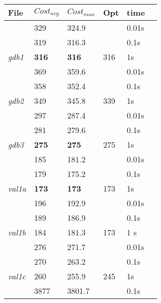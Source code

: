 \documentclass[conference,compsoc]{IEEEtran}
\begin{document}
\begin{minipage}{\linewidth}
	\centering	
	 \label{tab:title} 	
	\begin{tabular}{ C{0.6in} C{0.4in} *4{C{0.4in}}}\toprule[0.4pt]
		\bf File          & \bf $Cost_{avg}$  & \bf $Cost_{max}$ & \bf Opt & \bf time \\\midrule
						  & 329               & 324.9            &         & 0.01s    \\
				          & 319               & 316.3            &         & 0.1s     \\
		\textit{gdb1}     & \bf 316           & \bf 316          & 316     & 1s       \\
		\bottomrule[0.25pt]
						  & 369               & 359.6            &         & 0.01s    \\
						  & 358               & 352.4            &         & 0.1s     \\
		\textit{gdb2}	  & 349               & 345.8            & 339     & 1s       \\
		\bottomrule[0.25pt]
						  & 297               & 287.4            &         & 0.01s    \\
						  & 281 		      & 279.6            &         & 0.1s     \\
		\textit{gdb3}	  & \bf 275           & \bf 275          & 275     & 1s       \\   
		\bottomrule[0.25pt]
						  & 185        		  & 181.2			 &         & 0.01s    \\
						  & 179               & 175.2            &         & 0.1s     \\
		\textit{val1a}	  & \bf 173           & \bf 173          & 173     & 1s       \\
		\bottomrule[0.25pt]	
						  & 196               & 192.9            &         & 0.01s    \\
						  & 189               & 186.9            &         & 0.1s     \\
		\textit{val1b}	  & 184			      & 181.3            & 173     & 1 s      \\
		\bottomrule[0.25pt]
						  & 276               & 271.7            &         & 0.01s    \\
						  & 270               & 263.2            &         & 0.1s     \\
		\textit{val1c}    & 260               & 255.9            & 245     & 1s       \\ 
		\bottomrule[0.25pt]
						  & 3877              & 3801.7           &         & 0.1s     \\

\end{tabular}
\end{minipage}
\end{document}
